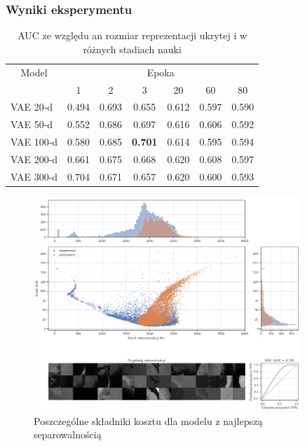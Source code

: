 \documentclass[polish, 13pt]{beamer}
\begin{document}
\begin{frame}
 \frametitle{Wyniki eksperymentu}
 \begin{table}
    \centering
    \begin{tabular}{ l | c c c c c c }
 
    \multicolumn{1}{c}{Model} & \multicolumn{6}{c}{Epoka} \\
    \cmidrule(r){1-1} \cmidrule(r){2-7}
     		& 1 & 2 & 3 & 20 & 60 & 80 \\ \cmidrule(r){2-7}
    VAE 20-d 	& 0.494 & 0.693 & 0.655 & 0.612 & 0.597 & 0.590 \\ \hline
    VAE 50-d 	& 0.552 & 0.686 & 0.697 & 0.616 & 0.606 & 0.592 \\ \hline
    VAE 100-d 	& 0.580 & 0.685 & \textbf{0.701} & 0.614 & 0.595 & 0.594 \\ \hline
    VAE 200-d   & 0.661 & 0.675 & 0.668 & 0.620 & 0.608 & 0.597 \\ \hline
    VAE 300-d   & 0.704 & 0.671 & 0.657 & 0.620 & 0.600 & 0.593 \\
    \toprule
    \end{tabular}
    \caption{AUC ze względu an rozmiar reprezentacji ukrytej i w różnych stadiach nauki}
\end{table}
\end{frame}

\begin{frame}
 \begin{figure}
    \centering
    \includegraphics[width=0.9\textwidth]{images/soft_vae_v2}
    \caption{Poszczególne składniki kosztu dla modelu z najlepszą separowalnością}
\end{figure}
\end{frame}
\end{document}
